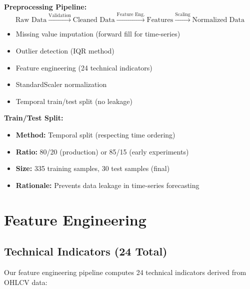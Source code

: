 \textbf{Preprocessing Pipeline:}
\begin{equation}
\text{Raw Data} \xrightarrow{\text{Validation}} \text{Cleaned Data} \xrightarrow{\text{Feature Eng.}} \text{Features} \xrightarrow{\text{Scaling}} \text{Normalized Data}
\end{equation}

\begin{itemize}
    \item Missing value imputation (forward fill for time-series)
    \item Outlier detection (IQR method)
    \item Feature engineering (24 technical indicators)
    \item StandardScaler normalization
    \item Temporal train/test split (no leakage)
\end{itemize}

\textbf{Train/Test Split:}
\begin{itemize}
    \item \textbf{Method:} Temporal split (respecting time ordering)
    \item \textbf{Ratio:} 80/20 (production) or 85/15 (early experiments)
    \item \textbf{Size:} 335 training samples, 30 test samples (final)
    \item \textbf{Rationale:} Prevents data leakage in time-series forecasting
\end{itemize}

\section{Feature Engineering}

\subsection{Technical Indicators (24 Total)}

Our feature engineering pipeline computes 24 technical indicators derived from OHLCV data:

